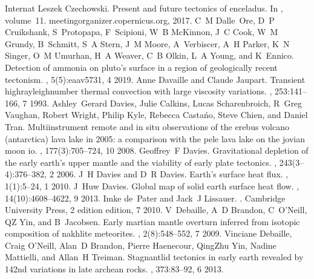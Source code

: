 \documentclass[letterpaper,10pt,english]{jupyterBook}
\begin{document}
\begin{sphinxthebibliography}{Internat}
\sphinxAtStartPar
Leszek Czechowski. Present and future tectonics of enceladus. In , volume 11. meetingorganizer.copernicus.org, 2017.
\sphinxAtStartPar
C M Dalle Ore, D P Cruikshank, S Protopapa, F Scipioni, W B McKinnon, J C Cook, W M Grundy, B Schmitt, S A Stern, J M Moore, A Verbiscer, A H Parker, K N Singer, O M Umurhan, H A Weaver, C B Olkin, L A Young, and K Ennico. Detection of ammonia on pluto's surface in a region of geologically recent tectonism. , 5(5):eaav5731, 4 2019.
\sphinxAtStartPar
Anne Davaille and Claude Jaupart. Transient high\sphinxhyphen{}rayleigh\sphinxhyphen{}number thermal convection with large viscosity variations. , 253:141–166, 7 1993.
\sphinxAtStartPar
Ashley Gerard Davies, Julie Calkins, Lucas Scharenbroich, R Greg Vaughan, Robert Wright, Philip Kyle, Rebecca Castańo, Steve Chien, and Daniel Tran. Multi\sphinxhyphen{}instrument remote and in situ observations of the erebus volcano (antarctica) lava lake in 2005: a comparison with the pele lava lake on the jovian moon io. , 177(3):705–724, 10 2008.
\sphinxAtStartPar
Geoffrey F Davies. Gravitational depletion of the early earth's upper mantle and the viability of early plate tectonics. , 243(3–4):376–382, 2 2006.
\sphinxAtStartPar
J H Davies and D R Davies. Earth's surface heat flux. , 1(1):5–24, 1 2010.
\sphinxAtStartPar
J Huw Davies. Global map of solid earth surface heat flow. , 14(10):4608–4622, 9 2013.
\sphinxAtStartPar
Imke de Pater and Jack J Lissauer. . Cambridge University Press, 2 edition edition, 7 2010.
\sphinxAtStartPar
V Debaille, A D Brandon, C O'Neill, Q\sphinxhyphen{}Z Yin, and B Jacobsen. Early martian mantle overturn inferred from isotopic composition of nakhlite meteorites. , 2(8):548–552, 7 2009.
\sphinxAtStartPar
Vinciane Debaille, Craig O'Neill, Alan D Brandon, Pierre Haenecour, Qing\sphinxhyphen{}Zhu Yin, Nadine Mattielli, and Allan H Treiman. Stagnant\sphinxhyphen{}lid tectonics in early earth revealed by 142nd variations in late archean rocks. , 373:83–92, 6 2013.

\end{sphinxthebibliography}
\end{document}
